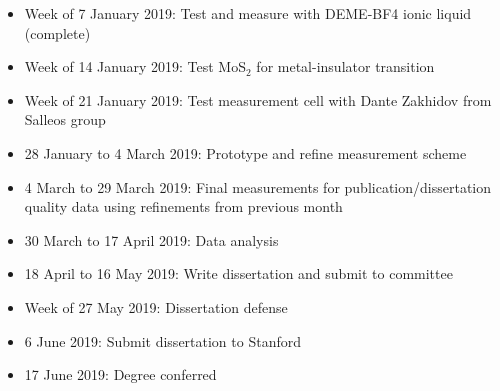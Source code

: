 \documentclass[11pt]{article}
\begin{document}
\begin{multicols}{2}
\begin{itemize}
	\item Week of 7  January 2019: Test and measure with DEME-BF4 ionic liquid (complete)
	\item Week of 14 January 2019: Test MoS$_{2}$ for metal-insulator transition
	\item Week of 21 January 2019: Test measurement cell with Dante Zakhidov from Salleos group
	\item 28 January to 4 March 2019: Prototype and refine measurement scheme
	\item 4 March to 29 March 2019: Final measurements for publication/dissertation quality data using refinements from previous month
	\item 30 March to 17 April 2019: Data analysis
	\item 18 April to 16 May 2019: Write dissertation and submit to committee
	\item Week of 27 May 2019: Dissertation defense
	\item 6 June 2019: Submit dissertation to Stanford
	\item 17 June 2019: Degree conferred	
\end{itemize}




\end{multicols}
\end{document}
